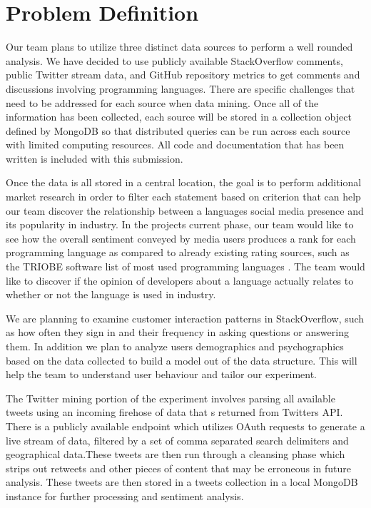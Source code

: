 \documentclass{sig-alternate}
\begin{document}
\section{Problem Definition}
\label{Problem Definition}

Our team plans to utilize three distinct data sources to perform a well rounded analysis. We have decided to use publicly available StackOverflow comments, public Twitter stream data, and GitHub repository metrics to get comments and discussions involving programming languages. There are specific challenges that need to be addressed for each source when data mining. Once all of the information has been collected, each source will be stored in a collection object defined by MongoDB so that distributed queries can be run across each source with limited computing resources. All code and documentation that has been written is included with this submission.

Once the data is all stored in a central location, the goal is to perform additional market research in order to filter each statement based on criterion that can help our team discover the relationship between a language\textsc{}s social media presence and its popularity in industry. In the project\textsc{}s current phase, our team would like to see how the overall sentiment conveyed by media users produces a rank for each programming language as compared to already existing rating sources, such as the TRIOBE software list of most used programming languages \cite{TIOBERATINGS}. The team would like to discover if the opinion of developers about a language actually relates to whether or not the language is used in industry. 

We are planning to examine customer interaction patterns in StackOverflow, such as how often they sign in and their frequency in asking questions or answering them. In addition we plan to analyze user\textsc{}s demographics and psychographics based on the data collected to build a model out of the data structure. This will help the team to understand user behaviour and tailor our experiment.  

The Twitter mining portion of the experiment involves parsing all available tweets using an incoming firehose of data that s returned from Twitter\textsc{}s API. There is a publicly available endpoint which utilizes OAuth requests to generate a live stream of data, filtered by a set of comma separated search delimiters and geographical data.These tweets are then run through a cleansing phase which strips out retweets and other pieces of content that may be erroneous in future analysis. These tweets are then stored in a \textsc{}tweets\textsc{} collection in a local MongoDB instance for further processing and sentiment analysis. 
\end{document}
